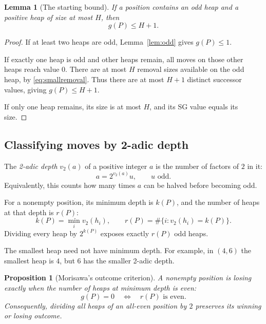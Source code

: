 \documentclass[11pt]{article}
\newtheorem{lemma}[theorem]{Lemma}
\newtheorem{proposition}[theorem]{Proposition}
\begin{document}
\begin{lemma}[The starting bound]
\label{lem:base}
If a position contains an odd heap and a positive heap of
size at most $H$, then
\[
 g(P)\le H+1.
\]
\end{lemma}

\begin{proof}
If at least two heaps are odd, Lemma~\ref{lem:odd} gives
$g(P)\le1$.

If exactly one heap is odd and other heaps remain, all moves
on those other heaps reach value $0$. There are at most $H$
removal sizes available on the odd heap, by
\eqref{eq:smallremoval}. Thus there are at most $H+1$
distinct successor values, giving $g(P)\le H+1$.

If only one heap remains, its size is at most $H$, and its
SG value equals its size.
\end{proof}

\subsection{Classifying moves by 2-adic depth}

The \emph{2-adic depth} $v_2(a)$ of a positive integer $a$
is the number of factors of $2$ in it:
\[
 a=2^{v_2(a)}u,
 \qquad u\text{ odd}.
\]
Equivalently, this counts how many times $a$ can be halved
before becoming odd.

For a nonempty position, its minimum depth is $k(P)$, and
the number of heaps at that depth is $r(P)$:
\begin{equation}
 k(P)=\min_i v_2(h_i),
 \qquad
 r(P)=\#\{i:v_2(h_i)=k(P)\}.
 \label{eq:depth}
\end{equation}
Dividing every heap by $2^{k(P)}$ exposes exactly $r(P)$
odd heaps.

The smallest heap need not have minimum depth. For example,
in $(4,6)$ the smallest heap is $4$, but $6$ has the smaller
2-adic depth.

\begin{proposition}[Morisawa's outcome criterion]
\label{prop:halving}
A nonempty position is losing exactly when the number of heaps
at minimum depth is even:
\begin{equation}
 \boxed{
 g(P)=0
 \quad\Longleftrightarrow\quad
 r(P)\text{ is even}.
 }
 \label{eq:outcome}
\end{equation}
Consequently, dividing all heaps of an all-even position by
$2$ preserves its winning or losing outcome.
\end{proposition}
\end{document}
